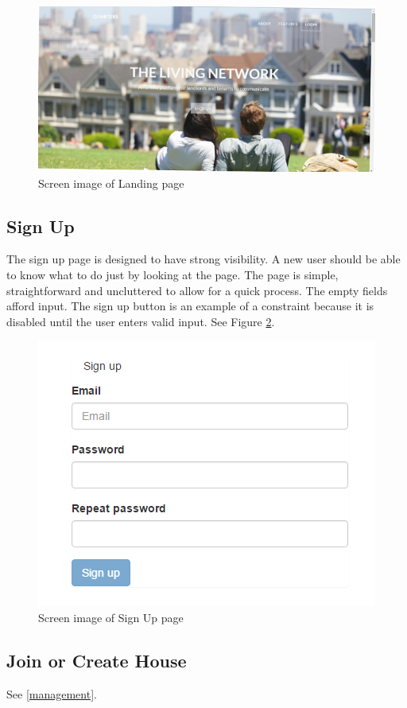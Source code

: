 \documentclass[12pt]{article}
\begin{document}
\begin{figure}
\centering
\includegraphics[width=\textwidth]{landing}
\caption{Screen image of Landing page}
\label{fig:landingPage}
\end{figure}

\subsection{Sign Up}
The sign up page is designed to have strong visibility. A new user should be able to know what to do just by looking at the page. The page is simple, straightforward and uncluttered to allow for a quick process. The empty fields afford input. The sign up button is an example of a constraint because it is disabled until the user enters valid input. See Figure \ref{fig:signup}.

\begin{figure}
\centering
\includegraphics{signup}
\caption{Screen image of Sign Up page}
\label{fig:signup}
\end{figure}

\subsection{Join or Create House}
See \ref{management}.
\end{document}
